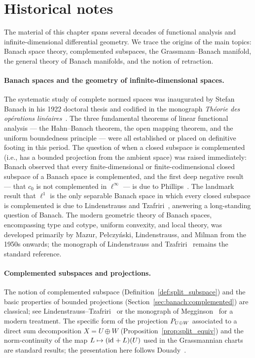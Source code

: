 \section{Historical notes}
\label{sec:banach:history}

The material of this chapter spans several decades of functional
analysis and infinite-dimensional differential geometry. We trace the
origins of the main topics: Banach space theory, complemented subspaces,
the Grassmann--Banach manifold, the general theory of Banach manifolds,
and the notion of retraction.

\paragraph{Banach spaces and the geometry of infinite-dimensional spaces.}
The systematic study of complete normed spaces was inaugurated by Stefan
Banach in his 1922 doctoral thesis and codified in the monograph
\emph{Théorie des opérations linéaires}~\cite{Banach1932}. The three
fundamental theorems of linear functional analysis — the Hahn--Banach
theorem, the open mapping theorem, and the uniform boundedness principle
— were all established or placed on definitive footing in this period.
The question of when a closed subspace is complemented (i.e., has a
bounded projection from the ambient space) was raised immediately:
Banach observed that every finite-dimensional or finite-codimensional
closed subspace of a Banach space is complemented, and the first deep
negative result — that $c_0$ is not complemented in $\ell^\infty$ —
is due to Phillips~\cite{Phillips1940}. The landmark result that $\ell^1$
is the only separable Banach space in which every closed subspace is
complemented is due to Lindenstrauss and
Tzafriri~\cite{LindenstraussTzafriri1971}, answering a long-standing
question of Banach. The modern geometric theory of Banach spaces,
encompassing type and cotype, uniform convexity, and local theory, was
developed primarily by Mazur, Pe\l czy\'{n}ski, Lindenstrauss, and
Milman from the 1950s onwards; the monograph of Lindenstrauss and
Tzafriri~\cite{LindenstraussTzafriri1977} remains the standard reference.

\paragraph{Complemented subspaces and projections.}
The notion of complemented subspace
(Definition~\ref{def:split_subspace}) and the basic properties of
bounded projections (Section~\ref{sec:banach:complemented}) are classical;
see Lindenstrauss--Tzafriri~\cite{LindenstraussTzafriri1977} or the
monograph of Megginson~\cite{Megginson1998} for a modern treatment.
The specific form of the projection $P_{U \oplus W}$ associated to a direct
sum decomposition $X = U \oplus W$
(Proposition~\ref{prop:split_equiv}) and the
norm-continuity of the map $L \mapsto (\mathrm{id}_{} + L)(U)$ used in the
Grassmannian charts are standard results; the presentation here follows
Douady~\cite{Douady1966}.

